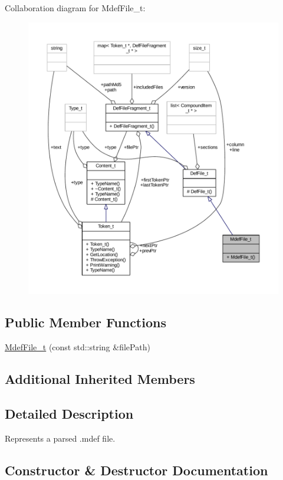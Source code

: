 Collaboration diagram for Mdef\+File\+\_\+t\+:
\nopagebreak
\begin{figure}[H]
\begin{center}
\leavevmode
\includegraphics[width=350pt]{struct_mdef_file__t__coll__graph}
\end{center}
\end{figure}
\subsection*{Public Member Functions}
\begin{DoxyCompactItemize}
\item 
\hyperlink{struct_mdef_file__t_a30115a85f82cf909bc8fd92c8ac2b757}{Mdef\+File\+\_\+t} (const std\+::string \&file\+Path)
\end{DoxyCompactItemize}
\subsection*{Additional Inherited Members}


\subsection{Detailed Description}
Represents a parsed .mdef file. 

\subsection{Constructor \& Destructor Documentation}
